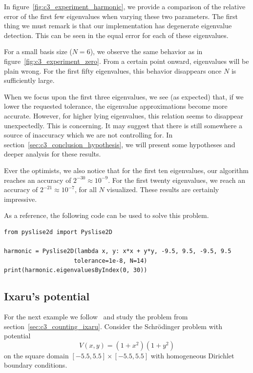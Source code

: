 In figure~\ref{fig:c3_experiment_harmonic}, we provide a comparison of the relative error of the first few eigenvalues when varying these two parameters. The first thing we must remark is that our implementation has degenerate eigenvalue detection. This can be seen in the equal error for each of these eigenvalues.

For a small basis size ($N = 6$), we observe the same behavior as in figure~\ref{fig:c3_experiment_zero}. From a certain point onward, eigenvalues will be plain wrong. For the first fifty eigenvalues, this behavior disappears once $N$ is sufficiently large.

When we focus upon the first three eigenvalues, we see (as expected) that, if we lower the requested tolerance, the eigenvalue approximations become more accurate. However, for higher lying eigenvalues, this relation seems to disappear unexpectedly. This is concerning. It may suggest that there is still somewhere a source of inaccuracy which we are not controlling for. In section~\ref{sec:c3_conclusion_hypothesis}, we will present some hypotheses and deeper analysis for these results.

Ever the optimists, we also notice that for the first ten eigenvalues, our algorithm reaches an accuracy of $2^{-30} \approx 10^{-9}$. For the first twenty eigenvalues, we reach an accuracy of $2^{-21} \approx 10^{-7}$, for all $N$ visualized. These results are certainly impressive.

As a reference, the following code can be used to solve this problem.
\begin{verbatim}
from pyslise2d import Pyslise2D

harmonic = Pyslise2D(lambda x, y: x*x + y*y, -9.5, 9.5, -9.5, 9.5
                    tolerance=1e-8, N=14)
print(harmonic.eigenvaluesByIndex(0, 30))
\end{verbatim}


\subsection{Ixaru's potential}\label{sec:c3_experiment_ixaru}

For the next example we follow~\cite{ixaru_new_2010} and study the problem from section~\ref{sec:c3_counting_ixaru}. Consider the Schrödinger problem with potential
$$
  V(x, y) = (1+x^2)(1+y^2)
$$
on the square domain $[-5.5, 5.5] \times [-5.5, 5.5]$ with homogeneous Dirichlet boundary conditions.

